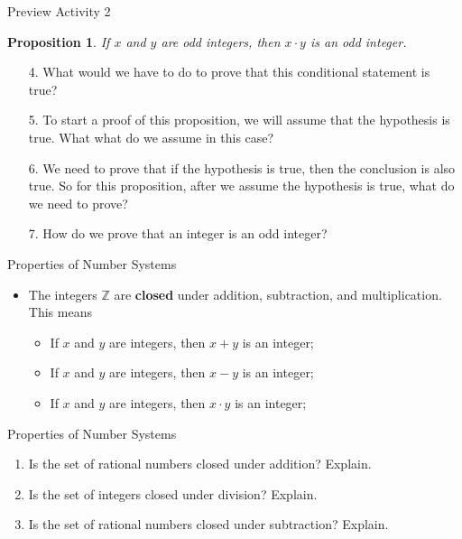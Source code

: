 \documentclass{beamer}
\newtheorem{prop}[theorem]{Proposition}
\begin{document}
\begin{frame}{Preview Activity 2}
	\begin{prop}
		If $x$ and $y$ are odd integers, then $x \cdot y$ is an odd integer.
	\end{prop}
	
	\begin{enumerate}
		\item[4.] What would we have to do to prove that this conditional statement is true? \pause
		\item[5.] To start a proof of this proposition, we will assume that the hypothesis is true.  What what do we assume in this case? \pause
		\item[6.] We need to prove that if the hypothesis is true, then the conclusion is also true.  So for this proposition, after we assume the hypothesis is true, what do we need to prove?\pause
		\item[7.] How do we prove that an integer is an odd integer?
	\end{enumerate}
\end{frame}

\begin{frame}{Properties of Number Systems}
	\begin{itemize}
		\item The integers $\mathbb{Z}$ are \textbf{closed} under addition, subtraction, and multiplication.  This means
		\begin{itemize}
			\item If $x$ and $y$ are integers, then $x + y$ is an integer;
			\item If $x$ and $y$ are integers, then $x - y$ is an integer;
			\item If $x$ and $y$ are integers, then $x \cdot y$ is an integer;
		\end{itemize}
	\end{itemize}
\end{frame}

\begin{frame}{Properties of Number Systems}
	\begin{enumerate}
		\item Is the set of rational numbers closed under addition? Explain.\\[.75 in]
		\item Is the set of integers closed under division? Explain.\\[.75 in]
		\item Is the set of rational numbers closed under subtraction? Explain.\\[.75 in]
	\end{enumerate}
\end{frame}
\end{document}
